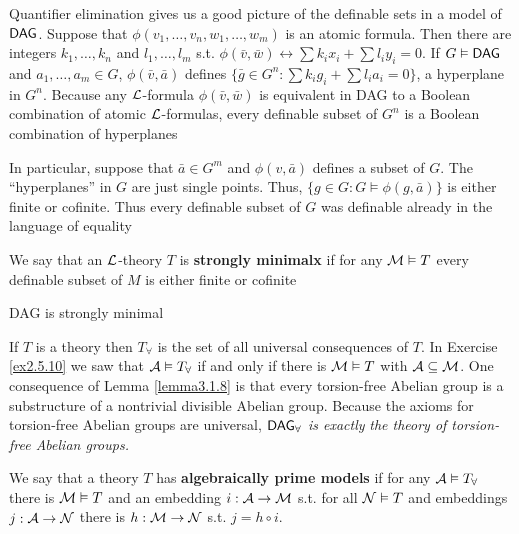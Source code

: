 \documentclass[11pt]{article}
\begin{document}
Quantifier elimination gives us a good picture of the definable sets in
a model of \(\operatorname{\textsf{DAG}}\). Suppose that \(\phi(v_1,\dots,v_n,w_1,\dots,w_m)\) is an atomic
formula. Then there are integers \(k_1,\dots,k_n\) and \(l_1,\dots,l_m\) s.t.
\(\phi(\bar{v},\bar{w})\leftrightarrow\sum k_ix_i+\sum l_iy_i=0\). If \(G\vDash\operatorname{\textsf{DAG}}\) and
\(a_1,\dots,a_m\in G\), \(\phi(\bar{v},\bar{a})\) defines
\(\{\bar{g}\in G^n:\sum k_ig_i+\sum l_ia_i=0\}\), a hyperplane in \(G^n\). Because
any \(\mathcal{L}\)-formula \(\phi(\bar{v},\bar{w})\) is equivalent in DAG to a
Boolean combination of atomic \(\mathcal{L}\)-formulas, every definable subset of
\(G^n\) is a Boolean combination of hyperplanes

In particular, suppose that \(\bar{a}\in G^m\) and \(\phi(v,\bar{a})\) defines a
subset of \(G\). The ``hyperplanes'' in \(G\) are just single points. Thus,
\(\{g\in G:G\vDash\phi(g,\bar{a})\}\) is either finite or cofinite. Thus
every definable subset of \(G\) was definable already in the language of equality

\begin{definition}[]
We say that an \(\mathcal{L}\)-theory \(T\) is \textbf{strongly minimalx} if for any
\(\mathcal{M}\vDash T\) every definable subset of \(M\) is either finite or cofinite
\end{definition}

\begin{corollary}[]
DAG is strongly minimal
\end{corollary}


If \(T\) is a theory then \(T_\forall\) is the set of all universal consequences
of \(T\). In Exercise \ref{ex2.5.10} we saw that \(\mathcal{A}\vDash T_\forall\) if and
only if there is \(\mathcal{M}\vDash T\) with \(\mathcal{A}\subseteq\mathcal{M}\). One
consequence of Lemma \ref{lemma3.1.8} is that every torsion-free Abelian group
is a substructure of a nontrivial divisible Abelian group. Because the
axioms for torsion-free Abelian groups are universal, \emph{\(\operatorname{\textsf{DAG}}_\forall\) is exactly}
\emph{the theory of torsion-free Abelian groups.}

We say that a theory \(T\) has \textbf{algebraically prime models} if for any
\(\mathcal{A}\vDash T_\forall\) there is \(\mathcal{M}\vDash T\) and an embedding
\(i:\mathcal{A}\to\mathcal{M}\) s.t. for all \(\mathcal{N}\vDash T\) and embeddings
\(j:\mathcal{A}\to\mathcal{N}\) there is \(h:\mathcal{M}\to\mathcal{N}\) s.t. \(j=h\circ i\).
\begin{center}
\end{center}
\end{document}
